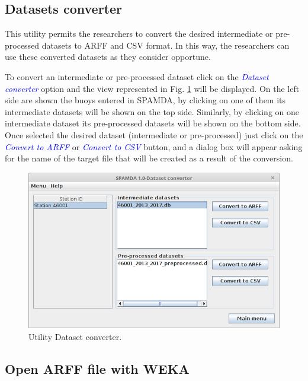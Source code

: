 \begin{onehalfspace}
			\subsection{Datasets converter}
			
				This utility permits the researchers to convert the desired intermediate or pre-processed datasets to ARFF and CSV format. In this way, the researchers can use these converted datasets as they consider opportune.
				
				To convert an intermediate or pre-processed dataset click on the \textcolor{blue}{\textit{Dataset converter}} option and the view represented in Fig. \ref{fig:convertDatasets} will be displayed. On the left side are shown the buoys entered in SPAMDA, by clicking on one of them its intermediate datasets will be shown on the top side. Similarly, by clicking on one intermediate dataset its pre-processed datasets will be shown on the bottom side. Once selected the desired dataset (intermediate or pre-processed) just click on the \textcolor{blue}{\textit{Convert to ARFF}} or \textcolor{blue}{\textit{Convert to CSV}} button, and a dialog box will appear asking for the name of the target file that will be created as a result of the conversion.
				
					\begin{figure}[ht!]
						\centering
						\includegraphics[scale=0.40]{figures/convertDatasets.png}
						\caption{Utility Dataset converter.}
						\label{fig:convertDatasets}
					\end{figure}
			
			\subsection{Open ARFF file with WEKA}
			

\end{onehalfspace}

